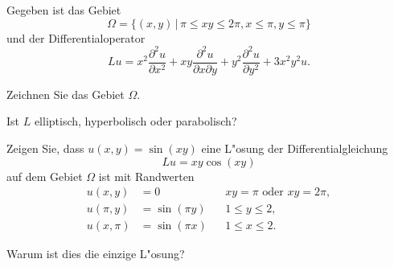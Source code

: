 Gegeben ist das Gebiet
\[
\Omega=\{
(x,y)\,|\,\pi\le xy\le 2\pi, x\le \pi,y\le \pi
\}
\]
und der Differentialoperator
\[
Lu=
x^2\frac{\partial^2u}{\partial x^2}
+xy\frac{\partial^2u}{\partial x\partial y}
+y^2\frac{\partial^2u}{\partial y^2}
+3x^2y^2u.
\]
\begin{teilaufgaben}
\item Zeichnen Sie das Gebiet $\Omega$.
\item Ist $L$ elliptisch, hyperbolisch oder parabolisch?
\item Zeigen Sie, dass $u(x,y)=\sin(xy)$ eine L"osung der
Differentialgleichung
\[
Lu=xy\cos(xy)
\]
auf dem Gebiet $\Omega$ ist mit Randwerten
\begin{align*}
u(x,y)&=0            &&\text{$xy=\pi$ oder $xy=2\pi$},\\
u(\pi,y)&=\sin(\pi y)&&1\le y\le 2,\\
u(x,\pi)&=\sin(\pi x)&&1\le x\le 2.
\end{align*}
\item Warum ist dies die einzige L"osung?
\end{teilaufgaben}

